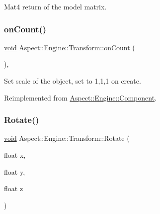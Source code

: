 Mat4 return of the model matrix. 

\mbox{\label{class_aspect_1_1_engine_1_1_transform_acb53a815498eea17774cc42cfa6c03bd}} 
\subsubsection{\texorpdfstring{on\+Count()}{onCount()}}
{\footnotesize\ttfamily \mbox{\hyperlink{_s_d_l__opengles2__gl2ext_8h_ae5d8fa23ad07c48bb609509eae494c95}{void}} Aspect\+::\+Engine\+::\+Transform\+::on\+Count (\begin{DoxyParamCaption}{ }\end{DoxyParamCaption})\hspace{0.3cm}{\ttfamily [override]}, {\ttfamily [virtual]}}



Set scale of the object, set to 1,1,1 on create. 



Reimplemented from \mbox{\hyperlink{class_aspect_1_1_engine_1_1_component_a02de673a0591459bd0d39e3022c1d3fc}{Aspect\+::\+Engine\+::\+Component}}.

\mbox{\label{class_aspect_1_1_engine_1_1_transform_a027f4280deda36eea07dfc396bc076cb}} 
\subsubsection{\texorpdfstring{Rotate()}{Rotate()}\hspace{0.1cm}{\footnotesize\ttfamily [1/2]}}
{\footnotesize\ttfamily \mbox{\hyperlink{_s_d_l__opengles2__gl2ext_8h_ae5d8fa23ad07c48bb609509eae494c95}{void}} Aspect\+::\+Engine\+::\+Transform\+::\+Rotate (\begin{DoxyParamCaption}\item[{float}]{x,  }\item[{float}]{y,  }\item[{float}]{z }\end{DoxyParamCaption})}



